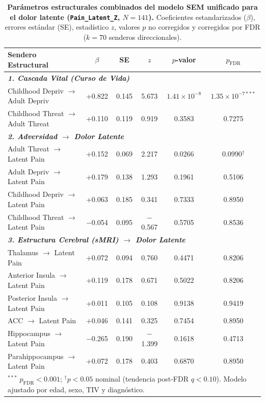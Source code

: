 \documentclass[11pt,a4paper]{article}
\begin{document}
\begin{table}[htbp]
\centering
\small
\caption{\textbf{Parámetros estructurales combinados del modelo SEM unificado para el dolor latente (\texttt{Pain\_Latent\_Z}, $N = 141$).} Coeficientes estandarizados ($\beta$), errores estándar (SE), estadístico $z$, valores $p$ no corregidos y corregidos por FDR ($k = 70$ senderos direccionales).}
\label{tab:sem_architecture}
\begin{tabular}{lccccc}
\toprule
\textbf{Sendero Estructural} & \textbf{$\beta$} & \textbf{SE} & \textbf{$z$} & \textbf{$p$-valor} & \textbf{$p_{\text{FDR}}$} \\
\midrule
\multicolumn{6}{l}{\textit{\textbf{1. Cascada Vital (Curso de Vida)}}} \\
\quad Childhood Depriv $\to$ Adult Depriv & +0.822 & 0.145 & 5.673 & $1.41 \times 10^{-8}$ & $1.35 \times 10^{-7***}$ \\
\quad Childhood Threat $\to$ Adult Threat & +0.110 & 0.119 & 0.919 & 0.3583 & 0.7275 \\
\midrule
\multicolumn{6}{l}{\textit{\textbf{2. Adversidad $\to$ Dolor Latente}}} \\
\quad Adult Threat $\to$ Latent Pain      & +0.152 & 0.069 & 2.217 & 0.0266 & 0.0990$^\dagger$ \\
\quad Adult Depriv $\to$ Latent Pain      & +0.179 & 0.138 & 1.293 & 0.1961 & 0.5106 \\
\quad Childhood Depriv $\to$ Latent Pain  & +0.063 & 0.185 & 0.341 & 0.7333 & 0.8950 \\
\quad Childhood Threat $\to$ Latent Pain  & $-$0.054 & 0.095 & $-$0.567 & 0.5705 & 0.8536 \\
\midrule
\multicolumn{6}{l}{\textit{\textbf{3. Estructura Cerebral (sMRI) $\to$ Dolor Latente}}} \\
\quad Thalamus $\to$ Latent Pain          & +0.072 & 0.094 & 0.760 & 0.4471 & 0.8206 \\
\quad Anterior Insula $\to$ Latent Pain   & +0.119 & 0.178 & 0.671 & 0.5022 & 0.8206 \\
\quad Posterior Insula $\to$ Latent Pain  & +0.011 & 0.105 & 0.108 & 0.9138 & 0.9419 \\
\quad ACC $\to$ Latent Pain               & +0.046 & 0.141 & 0.325 & 0.7454 & 0.8950 \\
\quad Hippocampus $\to$ Latent Pain       & $-$0.265 & 0.190 & $-$1.399 & 0.1618 & 0.4713 \\
\quad Parahippocampus $\to$ Latent Pain   & +0.072 & 0.178 & 0.403 & 0.6870 & 0.8950 \\
\bottomrule
\multicolumn{6}{l}{\footnotesize $^{***}$ $p_{\text{FDR}} < 0.001$; $^\dagger p < 0.05$ nominal (tendencia post-FDR $q < 0.10$). Modelo ajustado por edad, sexo, TIV y diagnóstico.}
\end{tabular}
\end{table}
\end{document}
